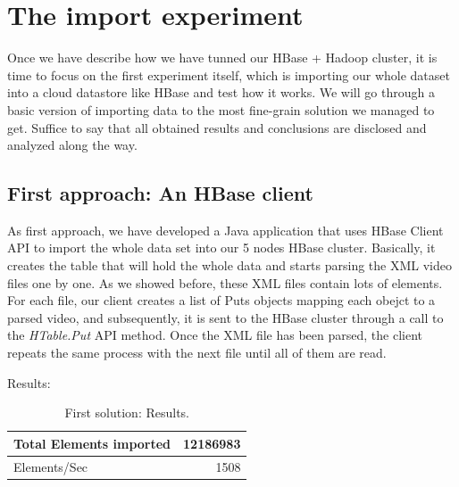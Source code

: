\section{The import experiment}

Once we have describe how we have tunned our HBase + Hadoop cluster, it is time to focus on the first experiment itself, which is importing our whole dataset into a cloud datastore like HBase and test how it works. We will go through a basic version of importing data to the most fine-grain solution we managed to get. Suffice to say that all obtained results and conclusions are disclosed and analyzed along the way.

\subsection{First approach: An HBase client}

As first approach, we have developed a Java application that uses HBase Client API to import the whole data set into our 5 nodes HBase cluster. Basically, it creates the table that will hold the whole data and starts parsing the XML video files one by one. As we showed before, these XML files contain lots of elements. For each file, our client creates a list of Puts objects mapping each obejct to a parsed video, and subsequently, it is sent to the HBase cluster through a call to the \textit{HTable.Put} API method. Once the XML file has been parsed, the client repeats the same process with the next file until all of them are read.

\bigskip

Results:

\bigskip



\begin{table}[htbp]
\begin{center}
\begin{tabular}{|l|r|}
\hline
Total Elements imported & 12186983 \\ \hline
Elements/Sec & 1508 \\ \hline
\end{tabular}
\caption{First solution: Results.}
\label{First solution: Results}
\end{center}
\end{table}





